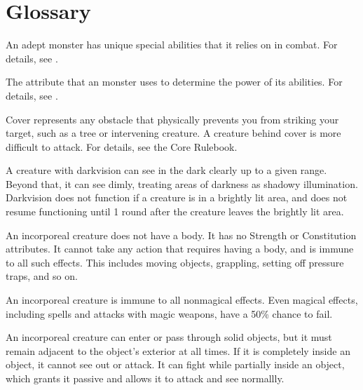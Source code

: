 \chapter{Glossary}\label{Glossary}

 An adept monster has unique special abilities that it relies on in combat.
For details, see .

 The attribute that an  monster uses to determine the power of its abilities.
For details, see .

 Cover represents any obstacle that physically prevents you from striking your target, such as a tree or intervening creature. A creature behind cover is more difficult to attack.
For details, see the Core Rulebook.

 A creature with darkvision can see in the dark clearly up to a given range.
Beyond that, it can see dimly, treating areas of darkness as shadowy illumination.
Darkvision does not function if a creature is in a brightly lit area, and does not resume functioning until 1 round after the creature leaves the brightly lit area.

 An incorporeal creature does not have a body.
It has no Strength or Constitution attributes.
It cannot take any action that requires having a body, and is immune to all such effects.
This includes moving objects, grappling, setting off pressure traps, and so on.

An incorporeal creature is immune to all nonmagical effects.
Even magical effects, including spells and attacks with magic weapons, have a 50\% chance to fail.

An incorporeal creature can enter or pass through solid objects, but it must remain adjacent to the object's exterior at all times.
If it is completely inside an object, it cannot see out or attack.
It can fight while partially inside an object, which grants it passive  and allows it to attack and see normallly.
